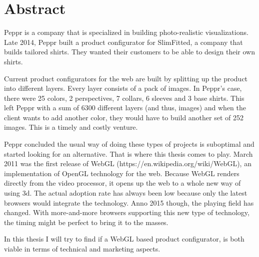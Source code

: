 \newpage
\section{Abstract}

Peppr is a company that is specialized in building photo-realistic visualizations. Late 2014, Peppr built a product configurator for SlimFitted, a company that builds tailored shirts. They wanted their customers to be able to design their own shirts. 

Current product configurators for the web are built by splitting up the product into different layers. Every layer consists of a pack of images. In Peppr's case, there were 25 colors, 2 perspectives, 7 collars, 6 sleeves and 3 base shirts. This left Peppr with a sum of 6300 different layers (and thus, images) and when the client wants to add another color, they would have to build another set of 252 images. This is a timely and costly venture.

Peppr concluded the usual way of doing these types of projects is suboptimal and started looking for an alternative. That is where this thesis comes to play. March 2011 was the first release of WebGL (https://en.wikipedia.org/wiki/WebGL), an implementation of OpenGL technology for the web. Because WebGL renders directly from the video processor, it opens up the web to a whole new way of using 3d. The actual adoption rate has always been low because only the latest browsers would integrate the technology. Anno 2015 though, the playing field has changed. With more-and-more browsers supporting this new type of technology, the timing might be perfect to bring it to the masses.

In this thesis I will try to find if a WebGL based product configurator, is both viable in terms of technical and marketing aspects.
\newpage